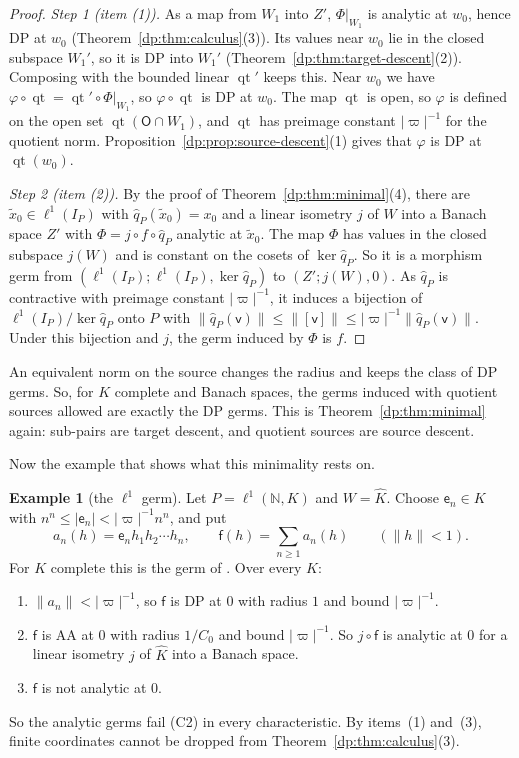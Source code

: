 \documentclass[11pt]{amsart}
\theoremstyle{definition}
\theoremstyle{remark}
\numberwithin{equation}{section}
\newcommand{\N}{\mathbb N}
\newcommand{\abs}[1]{\lvert #1\rvert}
\newcommand{\norm}[1]{\lVert #1\rVert}
\newcommand{\Kh}{\widehat K}
\theoremstyle{plain}
\theoremstyle{definition}
\newtheorem{example}[theorem]{Example}
\theoremstyle{plain}
\begin{document}
\begin{proof}
\emph{Step 1 (item (1)).} As a map from $W_1$ into $Z'$, $\Phi|_{W_1}$ is analytic at $w_0$, hence DP at $w_0$ (Theorem~\ref{dp:thm:calculus}(3)). Its values near $w_0$ lie in the closed subspace $W_1'$, so it is DP into $W_1'$ (Theorem~\ref{dp:thm:target-descent}(2)). Composing with the bounded linear $\operatorname{qt}'$ keeps this. Near $w_0$ we have $\varphi\circ\operatorname{qt}=\operatorname{qt}'\circ\Phi|_{W_1}$, so $\varphi\circ\operatorname{qt}$ is DP at $w_0$. The map $\operatorname{qt}$ is open, so $\varphi$ is defined on the open set $\operatorname{qt}(\mathsf O\cap W_1)$, and $\operatorname{qt}$ has preimage constant $\abs\varpi^{-1}$ for the quotient norm. Proposition~\ref{dp:prop:source-descent}(1) gives that $\varphi$ is DP at $\operatorname{qt}(w_0)$.

\emph{Step 2 (item (2)).} By the proof of Theorem~\ref{dp:thm:minimal}(4), there are $\tilde x_0\in\ell^1(I_P)$ with $\hat q_P(\tilde x_0)=x_0$ and a linear isometry $j$ of $W$ into a Banach space $Z'$ with $\Phi=j\circ f\circ\hat q_P$ analytic at $\tilde x_0$. The map $\Phi$ has values in the closed subspace $j(W)$ and is constant on the cosets of $\ker\hat q_P$. So it is a morphism germ from $(\ell^1(I_P);\ell^1(I_P),\ker\hat q_P)$ to $(Z';j(W),0)$. As $\hat q_P$ is contractive with preimage constant $\abs\varpi^{-1}$, it induces a bijection of $\ell^1(I_P)/\ker\hat q_P$ onto $P$ with $\norm{\hat q_P(\mathsf v)}\le\norm{[\mathsf v]}\le\abs\varpi^{-1}\norm{\hat q_P(\mathsf v)}$. Under this bijection and $j$, the germ induced by $\Phi$ is $f$.
\end{proof}

An equivalent norm on the source changes the radius and keeps the class of DP germs. So, for $K$ complete and Banach spaces, the germs induced with quotient sources allowed are exactly the DP germs. This is Theorem~\ref{dp:thm:minimal} again: sub-pairs are target descent, and quotient sources are source descent.

Now the example that shows what this minimality rests on.

\begin{example}[the $\ell^1$ germ]\label{dp:ex:l1}
Let $P=\ell^1(\N,K)$ and $W=\Kh$. Choose $\mathsf e_n\in K$ with $n^n\le\abs{\mathsf e_n}<\abs\varpi^{-1}n^n$, and put
\[
 a_n(h)=\mathsf e_nh_1h_2\cdots h_n,\qquad\mathsf f(h)=\sum_{n\ge1}a_n(h)\qquad(\norm h<1).
\]
For $K$ complete this is the germ of \cite[Theorem~14.33(1)]{I}. Over every $K$:
\begin{enumerate}
\item $\norm{a_n}<\abs\varpi^{-1}$, so $\mathsf f$ is DP at $0$ with radius $1$ and bound $\abs\varpi^{-1}$.
\item $\mathsf f$ is AA at $0$ with radius $1/C_0$ and bound $\abs\varpi^{-1}$. So $j\circ\mathsf f$ is analytic at $0$ for a linear isometry $j$ of $\Kh$ into a Banach space.
\item $\mathsf f$ is not analytic at $0$.
\end{enumerate}
So the analytic germs fail (C2) in every characteristic. By items~(1) and~(3), finite coordinates cannot be dropped from Theorem~\ref{dp:thm:calculus}(3).
\end{example}
\end{document}
